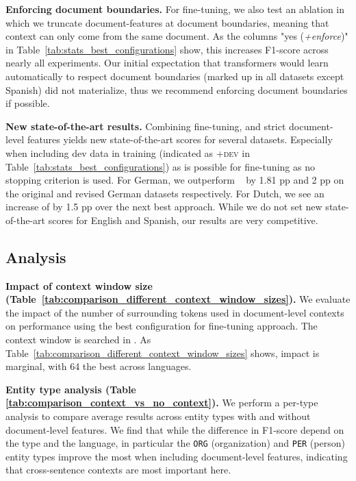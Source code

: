 \documentclass[11pt,a4paper]{article}
\begin{document}
\noindent
\textbf{Enforcing document boundaries.} For fine-tuning, we also test an ablation in which we truncate document-features at document boundaries, meaning that context can only come from the same document. As the columns "yes (\textit{+enforce})" in Table~\ref{tab:stats_best_configurations} show, this increases F1-score across nearly all experiments. Our initial expectation that transformers would learn automatically to respect document boundaries (marked up in all datasets except Spanish) did not materialize, thus we recommend enforcing document boundaries if possible.

\noindent 
\textbf{New state-of-the-art results.} 
Combining fine-tuning, and strict document-level features yields new state-of-the-art scores for several datasets. Especially when including dev data in training (indicated as \textsc{+dev} in Table~\ref{tab:stats_best_configurations}) as is possible for fine-tuning as no stopping criterion is used. For German, we outperform ~\cite{yu-etal-2020-named} by 1.81 pp and 2 pp on the original and revised German datasets respectively. For Dutch, we see an increase of by 1.5 pp over the next best approach. While we do not set new state-of-the-art scores for English and Spanish, our results are very competitive. 











\subsection{Analysis}
\vspace{-1mm}
\noindent
\textbf{Impact of context window size (Table~\ref{tab:comparison_different_context_window_sizes}).}
We evaluate the impact of the number of surrounding tokens used in document-level contexts on
performance using the best configuration for fine-tuning approach. The context window is searched in . As Table~\ref{tab:comparison_different_context_window_sizes} shows, impact is marginal, with 64 the best across languages. 

\noindent
\textbf{Entity type analysis (Table \ref{tab:comparison_context_vs_no_context}).}
We perform a per-type analysis to compare average results across entity types with and without document-level features. We find that while the difference in F1-score depend on the type and the language, in particular the 
{\tt ORG} (organization) and {\tt PER} (person) entity types improve the most when including document-level features, indicating that cross-sentence contexts are most important here.
\end{document}
